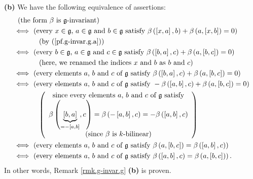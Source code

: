 \documentclass[etingof-lie.tex]{subfiles}
\begin{document}
\begin{verlong}
\textbf{(b)} We have the following equivalence of assertions:%
\begin{align*}
&  \ \left(  \text{the form }\beta\text{ is }\mathfrak{g}\text{-invariant}%
\right) \\
&  \Longleftrightarrow\ \left(  \text{every }x\in\mathfrak{g}\text{, }%
a\in\mathfrak{g}\text{ and }b\in\mathfrak{g}\text{ satisfy }\beta\left(
\left[  x,a\right]  ,b\right)  +\beta\left(  a,\left[  x,b\right]  \right)
=0\right) \\
&  \ \ \ \ \ \ \ \ \ \ \left(  \text{by (\ref{pf.g-invar.g.a})}\right) \\
&  \Longleftrightarrow\ \left(  \text{every }b\in\mathfrak{g}\text{, }%
a\in\mathfrak{g}\text{ and }c\in\mathfrak{g}\text{ satisfy }\beta\left(
\left[  b,a\right]  ,c\right)  +\beta\left(  a,\left[  b,c\right]  \right)
=0\right) \\
&  \ \ \ \ \ \ \ \ \ \ \left(  \text{here, we renamed the indices }x\text{ and
}b\text{ as }b\text{ and }c\right) \\
&  \Longleftrightarrow\ \left(  \text{every elements }a\text{, }b\text{ and
}c\text{ of }\mathfrak{g}\text{ satisfy }\beta\left(  \left[  b,a\right]
,c\right)  +\beta\left(  a,\left[  b,c\right]  \right)  =0\right) \\
&  \Longleftrightarrow\ \left(  \text{every elements }a\text{, }b\text{ and
}c\text{ of }\mathfrak{g}\text{ satisfy }-\beta\left(  \left[  a,b\right]
,c\right)  +\beta\left(  a,\left[  b,c\right]  \right)  =0\right) \\
&  \ \ \ \ \ \ \ \ \ \ \left(
\begin{array}
[c]{c}%
\text{since every elements }a\text{, }b\text{ and }c\text{ of }\mathfrak{g}%
\text{ satisfy}\\
\beta\left(  \underbrace{\left[  b,a\right]  }_{=-\left[  a,b\right]
},c\right)  =\beta\left(  -\left[  a,b\right]  ,c\right)  =-\beta\left(
\left[  a,b\right]  ,c\right) \\
\text{(since }\beta\text{ is }k\text{-bilinear)}%
\end{array}
\right) \\
&  \Longleftrightarrow\ \left(  \text{every elements }a\text{, }b\text{ and
}c\text{ of }\mathfrak{g}\text{ satisfy }\beta\left(  a,\left[  b,c\right]
\right)  =\beta\left(  \left[  a,b\right]  ,c\right)  \right) \\
&  \Longleftrightarrow\ \left(  \text{every elements }a\text{, }b\text{ and
}c\text{ of }\mathfrak{g}\text{ satisfy }\beta\left(  \left[  a,b\right]
,c\right)  =\beta\left(  a,\left[  b,c\right]  \right)  \right)  .
\end{align*}
In other words, Remark \ref{rmk.g-invar.g} \textbf{(b)} is proven.
\end{verlong}
\end{document}
